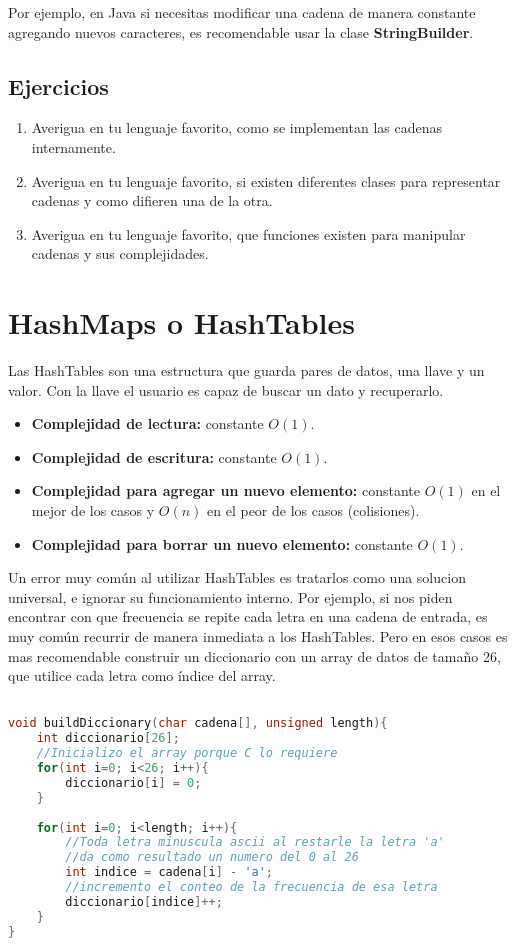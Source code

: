 Por ejemplo, en Java si necesitas modificar una cadena de manera constante agregando nuevos caracteres, es recomendable usar la clase \textbf{StringBuilder}.

\subsection{Ejercicios}

\begin{enumerate}
    \item Averigua en tu lenguaje favorito, como se implementan las cadenas internamente.
    \item Averigua en tu lenguaje favorito, si existen diferentes clases para representar cadenas y como difieren una de la otra.
    \item Averigua en tu lenguaje favorito, que funciones existen para manipular cadenas y sus complejidades.
\end{enumerate}

\section{HashMaps o HashTables}

Las HashTables son una estructura que guarda pares de datos, una llave y un valor. 
Con la llave el usuario es capaz de buscar un dato y recuperarlo. 

\begin{itemize}
    \item \textbf{Complejidad de lectura:} constante $O(1)$.
    \item \textbf{Complejidad de escritura:} constante $O(1)$.
    \item \textbf{Complejidad para agregar un nuevo elemento:} constante $O(1)$ en el mejor de los casos y $O(n)$ en el peor de los casos (colisiones).
    \item \textbf{Complejidad para borrar un nuevo elemento:} constante $O(1)$.
\end{itemize}

Un error muy común al utilizar HashTables es tratarlos como una solucion universal, e ignorar su funcionamiento interno. Por ejemplo, si nos piden encontrar con que frecuencia se repite cada letra en una cadena de entrada, es muy común recurrir de manera inmediata a los HashTables. Pero en esos casos es mas recomendable construir un diccionario con un array de datos de tamaño 26, que utilice cada letra como índice del array.

\begin{lstlisting}[language=C, caption=Diccionario sin hashtables]

void buildDiccionary(char cadena[], unsigned length){
    int diccionario[26];
    //Inicializo el array porque C lo requiere
    for(int i=0; i<26; i++){
        diccionario[i] = 0;
    }
    
    for(int i=0; i<length; i++){
        //Toda letra minuscula ascii al restarle la letra 'a'
        //da como resultado un numero del 0 al 26
        int indice = cadena[i] - 'a'; 
        //incremento el conteo de la frecuencia de esa letra
        diccionario[indice]++;
    }
}
\end{lstlisting}

